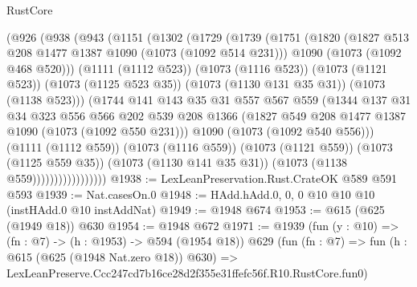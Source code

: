 \begin{lexlean}{RustCore}
\begin{coremodule}
                  (@926
                    (@938
                      (@943
                        (@1151
                          (@1302
                            (@1729
                              (@1739
                                (@1751
                                  (@1820
                                    (@1827 @513 @208 @1477 @1387 @1090 (@1073 (@1092 @514 @231)))
                                    @1090
                                    (@1073 (@1092 @468 @520)))
                                  (@1111 (@1112 @523))
                                  (@1073 (@1116 @523))
                                  (@1073 (@1121 @523))
                                  (@1073 (@1125 @523 @35))
                                  (@1073 (@1130 @131 @35 @31))
                                  (@1073 (@1138 @523)))
                                (@1744
                                  @141
                                  @143
                                  @35
                                  @31
                                  @557
                                  @567
                                  @559
                                  (@1344
                                    @137
                                    @31
                                    @34
                                    @323
                                    @556
                                    @566
                                    @202
                                    @539
                                    @208
                                    @1366
                                    (@1827 @549 @208 @1477 @1387 @1090 (@1073 (@1092 @550 @231)))
                                    @1090
                                    (@1073 (@1092 @540 @556)))
                                  (@1111 (@1112 @559))
                                  (@1073 (@1116 @559))
                                  (@1073 (@1121 @559))
                                  (@1073 (@1125 @559 @35))
                                  (@1073 (@1130 @141 @35 @31))
                                  (@1073 (@1138 @559)))))))))))))))))
@1938 := LexLeanPreservation.Rust.CrateOK @589 @591 @593
@1939 := Nat.casesOn.{0}
@1948 := HAdd.hAdd.{0, 0, 0} @10 @10 @10 (instHAdd.{0} @10 instAddNat)
@1949 := @1948 @674
@1953 := @615 (@625 (@1949 @18)) @630
@1954 := @1948 @672
@1971 := @1939
    (fun (y : @10) => (fn : @7) -> (h : @1953) -> @594 (@1954 @18))
    @629
    (fun (fn : @7) =>
    fun (h : @615 (@625 (@1948 Nat.zero @18)) @630) =>
    LexLeanPreserve.Ccc247cd7b16ce28d2f355e31ffefc56f.R10.RustCore.fun0)

\end{coremodule}
\end{lexlean}
